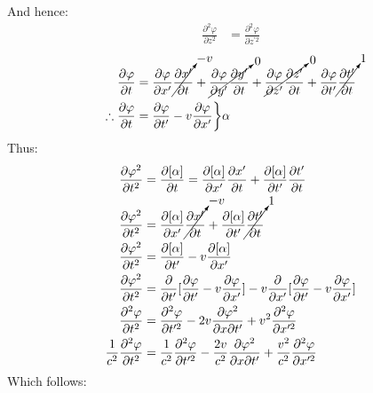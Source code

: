 \documentclass[letterpaper]{article}
\begin{document}
And hence:
\begin{align*}
\frac{\partial^2\varphi}{\partial z^2} &= \frac{\partial^2\varphi}{\partial z^{\prime 2}}
\end{align*}
\begin{align*}
\frac{\partial\varphi}{\partial t} &= \frac{\partial\varphi}{\partial x^\prime}\cancelto{-v}{\frac{\partial x^\prime}{\partial t}}
+\cancelto{0}{\frac{\partial\varphi}{\partial y^\prime}\frac{\partial y^\prime}{\partial t}}
+\cancelto{0}{\frac{\partial\varphi}{\partial z^\prime}\frac{\partial z^\prime}{\partial t}}
+\frac{\partial\varphi}{\partial t^\prime}\cancelto{1}{\frac{\partial t^\prime}{\partial t}}
\\\therefore
\frac{\partial\varphi}{\partial t} &= \frac{\partial\varphi}{\partial t^\prime}-v\frac{\partial\varphi}{\partial x^\prime}
\bigg\}\alpha
\end{align*}
Thus:
\begin{align*}
\frac{\partial\varphi^2}{\partial t^2} &= \frac{\partial [\alpha]}{\partial t} =
\frac{\partial[\alpha]}{\partial x^\prime}\frac{\partial x^\prime}{\partial t} +
\frac{\partial[\alpha]}{\partial t^\prime}\frac{\partial t^\prime}{\partial t}
\\
\frac{\partial\varphi^2}{\partial t^2} &=
\frac{\partial[\alpha]}{\partial x^\prime}\cancelto{-v}{\frac{\partial x^\prime}{\partial t}} +
\frac{\partial[\alpha]}{\partial t^\prime}\cancelto{1}{\frac{\partial t^\prime}{\partial t}}
\\
\frac{\partial\varphi^2}{\partial t^2} &=
\frac{\partial[\alpha]}{\partial t^\prime}-
v\frac{\partial[\alpha]}{\partial x^\prime}
\\
\frac{\partial\varphi^2}{\partial t^2} &=
\frac{\partial}{\partial t^\prime}[\frac{\partial\varphi}{\partial t^\prime}-v\frac{\partial\varphi}{\partial x^\prime}]
-v\frac{\partial}{\partial x^\prime}[\frac{\partial\varphi}{\partial t^\prime}-v\frac{\partial\varphi}{\partial x^\prime}]
\\
\frac{\partial^2\varphi}{\partial t^2} &=
\frac{\partial^2\varphi}{\partial t^{\prime 2}}
-2v\frac{\partial\varphi^2}{\partial x \partial t^\prime}
+v^2\frac{\partial^2\varphi}{\partial x^{\prime 2}}
\\
\frac{1}{c^2}\frac{\partial^2\varphi}{\partial t^2} &=
\frac{1}{c^2}\frac{\partial^2\varphi}{\partial t^{\prime 2}}
-\frac{2v}{c^2}\frac{\partial\varphi^2}{\partial x \partial t^\prime}
+\frac{v^2}{c^2}\frac{\partial^2\varphi}{\partial x^{\prime 2}}
\end{align*}
Which follows:
\end{document}
